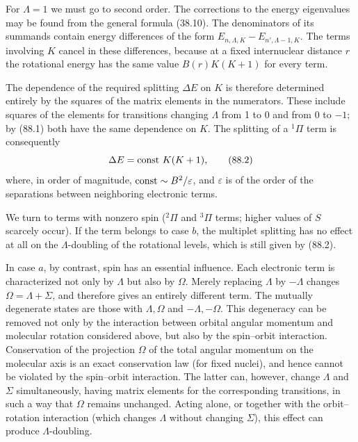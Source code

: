 For $\Lambda=1$ we must go to second order. The corrections to the energy eigenvalues may be found from the general formula (38.10). The denominators of its summands contain energy differences of the form $E_{n,\Lambda,K}-E_{n',\Lambda-1,K}$. The terms involving $K$ cancel in these differences, because at a fixed internuclear distance $r$ the rotational energy has the same value $B(r)K(K+1)$ for every term.

The dependence of the required splitting $\Delta E$ on $K$ is therefore determined entirely by the squares of the matrix elements in the numerators. These include squares of the elements for transitions changing $\Lambda$ from 1 to 0 and from 0 to $-1$; by (88.1) both have the same dependence on $K$. The splitting of a ${}^1\Pi$ term is consequently
\begin{equation}
\Delta E=\mathop{\rm const}\nolimits\,K(K+1),
\tag{88.2}
\end{equation}
where, in order of magnitude, $\mathop{\rm const}\nolimits\sim B^2/\varepsilon$, and $\varepsilon$ is of the order of the separations between neighboring electronic terms.

We turn to terms with nonzero spin (${}^2\Pi$ and ${}^3\Pi$ terms; higher values of $S$ scarcely occur). If the term belongs to case $b$, the multiplet splitting has no effect at all on the $\Lambda$-doubling of the rotational levels, which is still given by (88.2).

In case $a$, by contrast, spin has an essential influence. Each electronic term is characterized not only by $\Lambda$ but also by $\Omega$. Merely replacing $\Lambda$ by $-\Lambda$ changes $\Omega=\Lambda+\Sigma$, and therefore gives an entirely different term. The mutually degenerate states are those with $\Lambda,\Omega$ and $-\Lambda,-\Omega$. This degeneracy can be removed not only by the interaction between orbital angular momentum and molecular rotation considered above, but also by the spin--orbit interaction. Conservation of the projection $\Omega$ of the total angular momentum on the molecular axis is an exact conservation law (for fixed nuclei), and hence cannot be violated by the spin--orbit interaction. The latter can, however, change $\Lambda$ and $\Sigma$ simultaneously, having matrix elements for the corresponding transitions, in such a way that $\Omega$ remains unchanged. Acting alone, or together with the orbit--rotation interaction (which changes $\Lambda$ without changing $\Sigma$), this effect can produce $\Lambda$-doubling.


